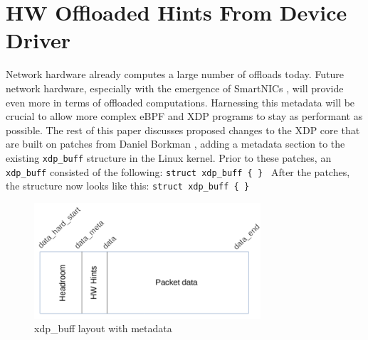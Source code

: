 \documentclass[letterpaper]{article}
\begin{document}
\section{HW Offloaded Hints From Device Driver} 

Network hardware already computes a large number of offloads today. Future network hardware, especially with the emergence of SmartNICs \cite{smartnic2016}, will provide even more in terms of offloaded computations. Harnessing this metadata will be crucial to allow more complex eBPF and XDP programs to stay as performant as possible.
\newline
\newline
The rest of this paper discusses proposed changes to the XDP core that are built on patches from Daniel Borkman \cite{borkmann2017}, adding a metadata section to the existing {\small \texttt{xdp\_buff}} structure in the Linux kernel. Prior to these patches, an {\small \texttt{xdp\_buff}} consisted of the following:
\newline
\newline
{\scriptsize \texttt{struct xdp\_buff \{
\newline
{}
\newline
{}
\newline
{}
\newline
\}
}}
\newline
\newline
After the patches, the structure now looks like this:
\newline
\newline
{\scriptsize \texttt{struct xdp\_buff \{
\newline
{}
\newline
{}
\newline
{}
\newline
{}
\newline
\}
}}
\newline

\begin{figure}[h]
\includegraphics[width=3.31in]{xdp-metadata-layout.png}
\caption{xdp\_buff layout with metadata}
\label{xdp-metadata-layout}
\end{figure}
\end{document}
